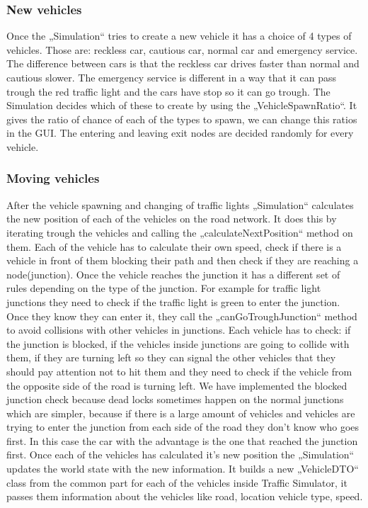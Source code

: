 \documentclass[a4paper,12pt]{article}
\begin{document}
\subsubsection{New vehicles}
Once the „Simulation“ tries to create  a new vehicle it has a choice of 4 types of vehicles. Those are: reckless car, cautious car, normal car and emergency service. The difference between cars is that the reckless car drives faster than normal and cautious slower. The emergency service is different in a way that it can pass trough the red traffic light and the cars have stop so it can go trough.
The Simulation decides which of these to create by using the „VehicleSpawnRatio“. It gives the ratio of chance of each of the types to spawn, we can change this ratios in the GUI.
\newline
The entering and leaving exit nodes are decided randomly for every vehicle.
\newline
\subsubsection{Moving vehicles}
After the vehicle spawning and changing of traffic lights „Simulation“ calculates the new position of each of the vehicles on the road network. It does this by iterating trough the vehicles and calling the „calculateNextPosition“ method on them. Each of the vehicle has to calculate their own speed, check if there is a vehicle in front of them blocking their path and then check if they are reaching a node(junction). Once the vehicle reaches the junction it has  a different set of rules depending on the type of the junction. For example for traffic light junctions they need to check if the traffic light is green to enter the junction. Once they know they can enter it, they call the „canGoTroughJunction“ method to avoid collisions with other vehicles in junctions. Each vehicle has to check: if the junction is blocked, if the vehicles inside junctions are going to collide with them, if they are turning left so they can signal the other vehicles that they should pay attention not to hit them and they need to check if the vehicle from the opposite side of the road is turning left.
\newline
We have implemented the blocked junction check because dead locks sometimes happen on the normal junctions which are simpler, because if there is a large amount of vehicles and vehicles are trying to enter the junction from each side of the road they don't know who goes first. In this case the car with the advantage is the one that reached the junction first.
\newline
Once each of the vehicles has calculated it's new position the „Simulation“ updates the world state with the new information. It builds a new „VehicleDTO“ class from the common part for each of the vehicles inside Traffic Simulator, it passes them information about the vehicles like road, location vehicle type, speed.
\end{document}
